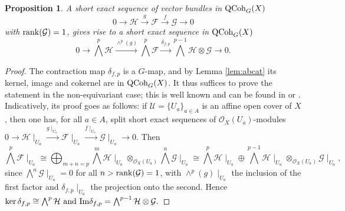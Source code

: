 \documentclass[10pt]{amsart}
\newtheorem{proposition}[theorem]{Proposition}
\theoremstyle{definition}
\begin{document}
\begin{proposition}\label{prop:contrprop}
A short exact sequence of vector bundles in ${\rm QCoh}_G(X)$ 
\[
0\rightarrow \mathcal{H}\overset{g}{\rightarrow}\mathcal{F}\overset{f}{\rightarrow}\mathcal{G}\rightarrow 0
\]
with ${\rm rank}(\mathcal{G})=1$, gives rise to a short exact sequence in ${\rm QCoh}_G(X)$ 
\[
0\rightarrow \bigwedge^{p}\mathcal{H}\overset{\wedge^p(g)}{\longrightarrow}\bigwedge^{p}\mathcal{F}\overset{\delta_{f,p}}{\longrightarrow}\bigwedge^{p-1}\mathcal{H}\otimes\mathcal{G}\rightarrow 0.
\]
\end{proposition}


\begin{proof}
The contraction map $\delta_{f,p}$ is a $G$-map, and by Lemma \ref{lem:abcat} its kernel, image and cokernel are in ${\rm QCoh}_G(X)$. It thus suffices to prove the statement in the non-equivariant case; this is well known and can be found in \cite[3.2]{MR1644323} or \cite[4.13]{MR1335917}. Indicatively, its proof goes as follows: if $\mathcal{U}=\{U_a\}_{a\in A}$ is an affine open cover of $X$, then one has, for all $a\in A$, split short exact sequences of $\mathcal{O}_X(U_a)$-modules
$0\rightarrow \mathcal{H}\mid_{U_a}\overset{g\mid_{U_a}}{\rightarrow}\mathcal{F}\mid_{U_a}\overset{f\mid_{U_a}}{\rightarrow}\mathcal{G}\mid_{U_a}\rightarrow 0$. Then
\[
\bigwedge^p\mathcal{F}\mid_{U_a}\cong \bigoplus_{m+n=p}\bigwedge^{m}\mathcal{H}\mid_{U_a}\otimes_{\mathcal{O}_X(U_a)}\bigwedge^{n}\mathcal{G}\mid_{U_a}
\cong
\bigwedge^{p}\mathcal{H}\mid_{U_a}
\oplus
 \bigwedge^{p-1}\mathcal{H}\mid_{U_a}\otimes_{\mathcal{O}_X(U_a)}\mathcal{G}\mid_{U_a},
\]
since $\bigwedge^{n}\mathcal{G}\mid_{U_a}=0$ for all $n>{\rm rank}(\mathcal{G})=1$, with $\wedge^p(g)\mid_{U_a}$ the inclusion of the first factor and $\delta_{f,p}\mid_{U_a}$ the projection onto the second. Hence $\ker \delta_{f,p}\cong \bigwedge^{p}\mathcal{H}\text{ and }{\rm Im}{\delta_{f,p}}=\bigwedge^{p-1}\mathcal{H}\otimes\mathcal{G}.
$
\end{proof}
\end{document}
